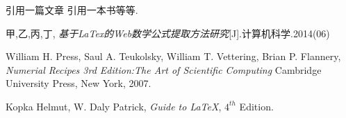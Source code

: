 \documentclass{article}
\begin{document}
	引用一篇文章\cite{article1}	引用一本书\cite{latexGuide}等等.
	
	\begin{thebibliography}{99}
		甲,乙,丙,丁,
		\emph{基于LaTex的Web数学公式提取方法研究}[J].计算机科学.2014(06)
		
		William H. Press, Saul A. Teukolsky,
		William T. Vettering, Brian P. Flannery,
		\emph{Numerial Recipes 3rd Edition:The Art of Scientific Computing}
		Cambridge University Press, New York, 2007.
		
		 Kopka Helmut, W. Daly Patrick,
		\emph{Guide to \LaTeX}, $4^{th}$ Edition.
	\end{thebibliography}
\end{document}
